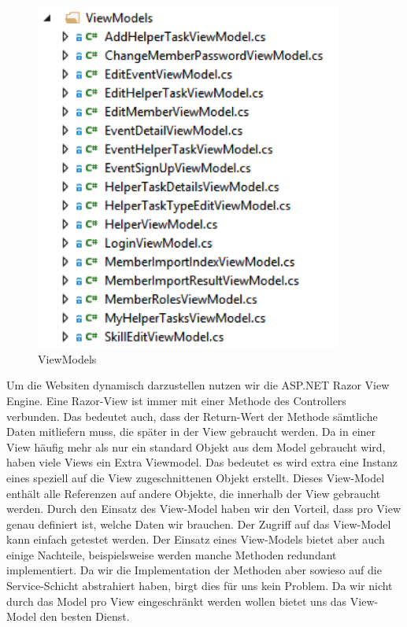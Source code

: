 			\begin{figure}[h]
		  		\vspace{-5pt}
		    	\centering
		    	 \includegraphics[width=0.9\textwidth]{content/architekturdokumentation/images/web-3-ViewModels.png}
		  		\vspace{-25pt}
				\caption{ViewModels}
			\end{figure}

			Um die Websiten dynamisch darzustellen nutzen wir die ASP.NET Razor View Engine. Eine Razor-View ist immer mit einer Methode des Controllers verbunden. Das bedeutet auch, dass der Return-Wert der Methode sämtliche Daten mitliefern muss, die später in der View gebraucht werden. Da in einer View häufig mehr als nur ein standard Objekt aus dem Model gebraucht wird, haben viele Views ein Extra Viewmodel. Das bedeutet es wird extra eine Instanz eines speziell auf die View zugeschnittenen Objekt erstellt. Dieses View-Model enthält alle Referenzen auf andere Objekte, die innerhalb der View gebraucht werden. Durch den Einsatz des View-Model haben wir den Vorteil, dass pro View genau definiert ist, welche Daten wir brauchen. Der Zugriff auf das View-Model kann einfach getestet werden. Der Einsatz eines View-Models bietet aber auch einige Nachteile, beispielsweise werden manche Methoden redundant implementiert. Da wir die Implementation der Methoden aber sowieso auf die Service-Schicht abstrahiert haben, birgt dies für uns kein Problem. Da wir nicht durch das Model pro View eingeschränkt werden wollen bietet uns das View-Model den besten Dienst.

